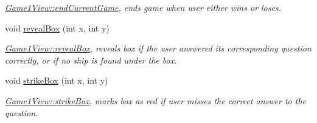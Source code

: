 \begin{DoxyCompactItemize}
\begin{DoxyCompactList}\small\item\em \hyperlink{classGame1View_ad1c25c3de31c9b0181af7e837284b0d5}{Game1\+View\+::end\+Current\+Game}, ends game when user either wins or loses. \end{DoxyCompactList}\item 
void \hyperlink{classGame1View_aa5ed1a0bd0034b87c20c649c3950a337}{reveal\+Box} (int x, int y)
\begin{DoxyCompactList}\small\item\em \hyperlink{classGame1View_aa5ed1a0bd0034b87c20c649c3950a337}{Game1\+View\+::reveal\+Box}, reveals box if the user answered its corresponding question correctly, or if no ship is found under the box. \end{DoxyCompactList}\item 
void \hyperlink{classGame1View_a0739a9638e33409f70bc1ab4337e3c83}{strike\+Box} (int x, int y)
\begin{DoxyCompactList}\small\item\em \hyperlink{classGame1View_a0739a9638e33409f70bc1ab4337e3c83}{Game1\+View\+::strike\+Box}, marks box as red if user misses the correct answer to the question. \end{DoxyCompactList}\end{DoxyCompactItemize}
